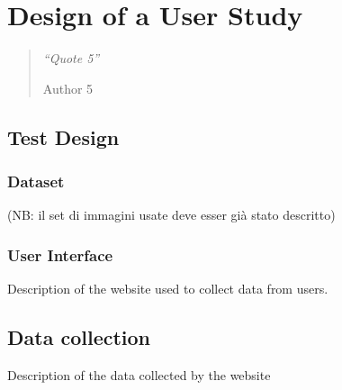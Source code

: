\chapter{Design of a User Study}
\label{chapter5}
\thispagestyle{empty}

\begin{quotation}
{\footnotesize
\noindent \emph{``Quote 5''}
\begin{flushright}
Author 5
\end{flushright}
}
\end{quotation}

\vspace{0.5cm}


\section{Test Design}

\subsection{Dataset}

(NB: il set di immagini usate deve esser già stato descritto)

\subsection{User Interface}

Description of the website used to collect data from users.

\vspace{0.5cm}

\section{Data collection}

Description of the data collected by the website